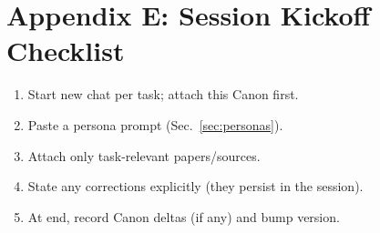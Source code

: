 \documentclass[11pt]{article}
\begin{document}
\section*{Appendix E: Session Kickoff Checklist}
        \begin{enumerate}
        \item Start new chat per task; attach this Canon first.
        \item Paste a persona prompt (Sec.~\ref{sec:personas}).
        \item Attach only task-relevant papers/sources.
        \item State any corrections explicitly (they persist in the session).
        \item At end, record Canon deltas (if any) and bump version.
        \end{enumerate}

        \nocite{*}
        
        
\end{document}
